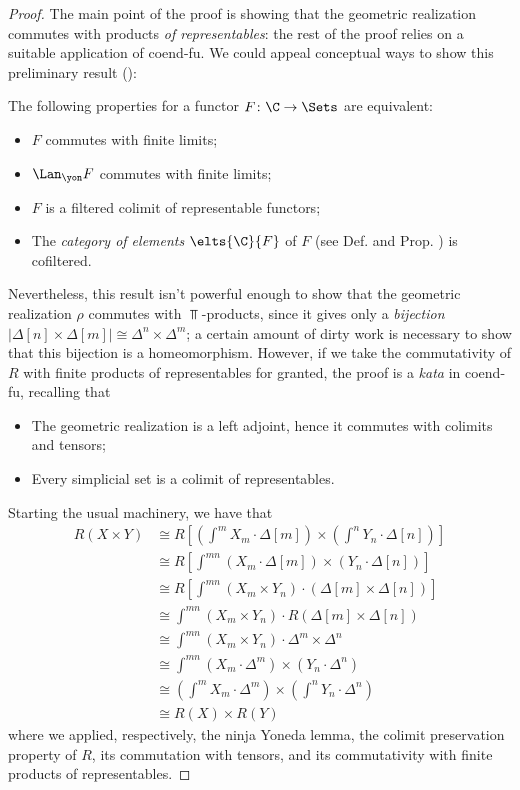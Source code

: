 \begin{proof}
The main point of the proof is showing that the geometric realization commutes with products \emph{of representables}: the rest of the proof relies on a suitable application of coend-fu. We could appeal conceptual ways to show this preliminary result (\cite[\S \textbf{2}]{adamek2002classification}):
\begin{proposition}\label{cofiltness}
The following properties for a functor $F\colon \C\to \Sets$ are equivalent:
\begin{itemize}
\item $F$ commutes with finite limits;
\item $\Lan_\yon F$ commutes with finite limits;
\item $F$ is a filtered colimit of representable functors;
\item The \emph{category of elements} $\elts{\C}{F}$ of $F$ (see Def\@.  and Prop\@. ) is cofiltered.
\end{itemize}
\end{proposition}
Nevertheless, this result isn't powerful enough to show that the geometric realization $\rho$ commutes with $\Top$-products, since it gives only a \emph{bijection} $|\Delta[n]\times \Delta[m]|\cong \Delta^n \times \Delta^m$; a certain amount of dirty work is necessary to show that this bijection is a homeomorphism. However, if we take the commutativity of $R$ with finite products of representables for granted, the proof is a \emph{kata} in coend-fu, recalling that
\begin{itemize}
\item The geometric realization is a left adjoint, hence it commutes with colimits and tensors;
\item Every simplicial set is a colimit of representables.
\end{itemize}
Starting the usual machinery, we have that
\begin{align*}
R( X\times  Y) &\cong \textstyle R\left[ \left(\int^m X_m\cdot \Delta[m] \right )\times \left( \int^n Y_n\cdot \Delta[n]\right ) \right ]\\
&\cong\textstyle R\left[ \int^{mn} (X_m\cdot \Delta[m])\times (Y_n\cdot \Delta[n])\right]\\
&\cong\textstyle R\left[\int^{mn} (X_m\times Y_n)\cdot (\Delta[m]\times \Delta[n]) \right ]\\
&\cong\textstyle \int^{mn}(X_m\times Y_n)\cdot R(\Delta[m]\times \Delta[n])\\
&\cong\textstyle \int^{mn}(X_m\times Y_n)\cdot \Delta^m\times\Delta^n \\
&\cong\textstyle \int^{mn} (X_m\cdot\Delta^m)\times (Y_n\cdot \Delta^n)\\
&\cong\textstyle \left(\int^mX_m\cdot\Delta^m\right)\times \left(\int^n Y_n\cdot \Delta^n \right )\\
&\cong  R( X)\times R( Y)
\end{align*}
where we applied, respectively, the ninja Yoneda lemma, the colimit preservation property of $R$, its commutation with tensors, and its commutativity with finite products of representables.
\end{proof}
